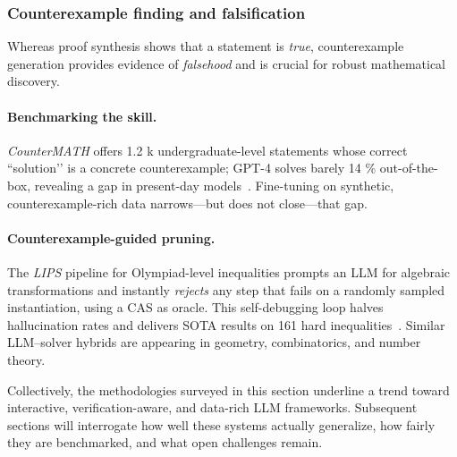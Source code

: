 \documentclass[acmsmall,anonymous]{acmart}
\begin{document}
\subsubsection{Counterexample finding and falsification}
\label{subsec:counterexamples}
Whereas proof synthesis shows that a statement is \emph{true},
counterexample generation provides evidence of \emph{falsehood} and is
crucial for robust mathematical discovery.

\paragraph{Benchmarking the skill.}
\emph{CounterMATH} offers 1.2 k undergraduate-level statements whose
correct “solution’’ is a concrete counterexample; GPT-4 solves barely
14 \% out-of-the-box, revealing a gap in present-day
models~\cite{li2025countermath}. Fine-tuning on synthetic,
counterexample-rich data narrows—but does not close—that gap.

\paragraph{Counterexample-guided pruning.}
The \emph{LIPS} pipeline for Olympiad-level inequalities prompts an LLM
for algebraic transformations and instantly \emph{rejects} any step that
fails on a randomly sampled instantiation, using a CAS as oracle. This
self-debugging loop halves hallucination rates and delivers SOTA results
on 161 hard inequalities~\cite{li2025lips}. Similar LLM–solver hybrids
are appearing in geometry, combinatorics, and number theory.


\bigskip
Collectively, the methodologies surveyed in this section underline a trend toward interactive, verification-aware, and data-rich LLM frameworks.  Subsequent sections will interrogate how well these systems actually generalize, how fairly they are benchmarked, and what open challenges remain.
\end{document}
